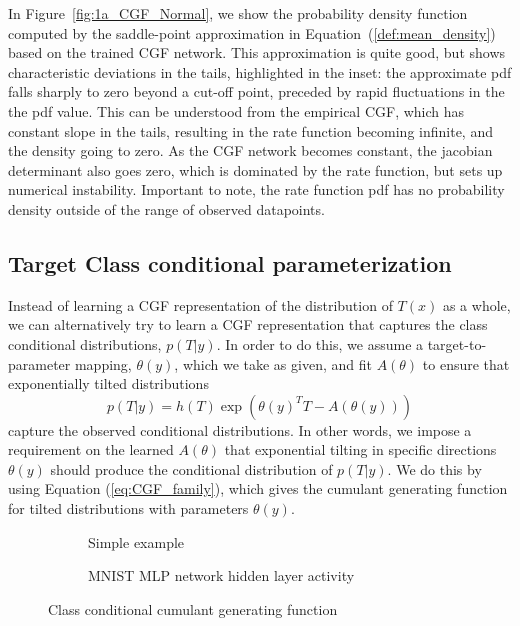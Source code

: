 \documentclass[11pt]{article}      %
\begin{document}
In Figure~\ref{fig:1a_CGF_Normal}, we show the probability density function computed by the saddle-point approximation in Equation~(\ref{def:mean_density}) based on the trained CGF network.
This approximation is quite good, but shows characteristic deviations in the tails, highlighted in the inset:
the approximate pdf falls sharply to zero beyond a cut-off point, preceded by rapid fluctuations in the the pdf value.
This can be understood from the empirical CGF, which has constant slope in the tails, resulting in the rate function becoming infinite, and the density going to zero.
As the CGF network becomes constant, the jacobian determinant also goes zero, which is dominated by the rate function, but sets up numerical instability.
Important to note, the rate function pdf has no probability density outside of the range of observed datapoints.




\subsection{Target Class conditional parameterization}

Instead of learning a CGF representation of the distribution of $T(x)$ as a whole, we can alternatively try to learn a CGF representation that captures the class conditional distributions, $p(T|y)$.
In order to do this, we assume a target-to-parameter mapping, $\theta(y)$, which we take as given, and fit $A(\theta)$ to ensure that exponentially tilted distributions
\begin{equation}
  p(T|y) = h(T) \exp(\theta(y)^T T - A(\theta(y))) \label{eq:class_conditional}
\end{equation}
capture the observed conditional distributions.
In other words, we impose a requirement on the learned $A(\theta)$ that exponential tilting in specific directions $\theta(y)$ should produce the conditional distribution of $p(T|y)$.
We do this by using Equation (\ref{eq:CGF_family}), which gives the cumulant generating function for tilted distributions with parameters $\theta(y)$.


\begin{figure}[tb]
  \centering
  \begin{subfigure}[t]{\textwidth}
    \centering
    \caption{Simple example}
    \label{fig:2a_conditional_example}
  \end{subfigure}
  \begin{subfigure}[t]{\textwidth}
    \centering
    \caption{MNIST MLP network hidden layer activity}
    \label{fig:2b_conditional_MNIST}
  \end{subfigure}

  \caption{Class conditional cumulant generating function}
  \label{fig:2_class_conditional}
\end{figure}
\end{document}
